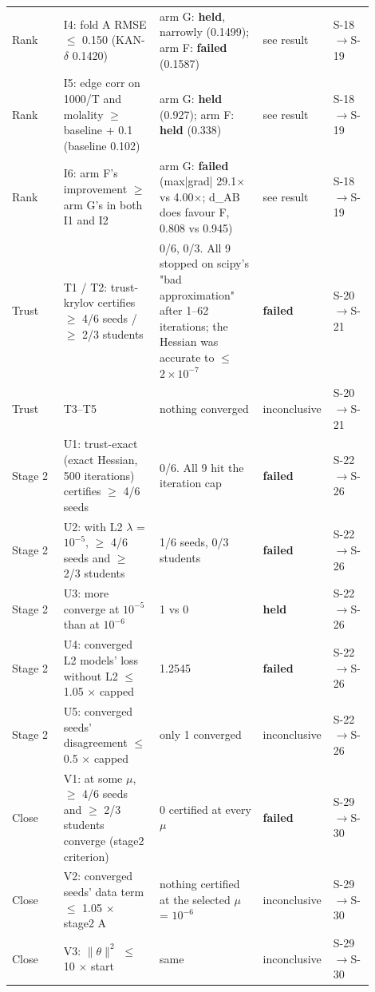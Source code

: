 {\begin{longtable}{R{0.14\linewidth} R{0.26\linewidth} R{0.29\linewidth} R{0.10\linewidth} R{0.11\linewidth}}
Rank & I4: fold A RMSE $\leq$ 0.150 (KAN-$\delta$ 0.1420) & arm G: \textbf{held}, narrowly (0.1499); arm F: \textbf{failed} (0.1587) & see result & S-18$\to$\allowbreak S-19 \\
Rank & I5: edge corr on 1000/T and molality $\geq$ baseline + 0.1 (baseline 0.102) & arm G: \textbf{held} (0.927); arm F: \textbf{held} (0.338) & see result & S-18$\to$\allowbreak S-19 \\
Rank & I6: arm F's improvement $\geq$ arm G's in both I1 and I2 & arm G: \textbf{failed} (max|grad| 29.1$\times$ vs 4.00$\times$; d\_AB does favour F, 0.808 vs 0.945) & see result & S-18$\to$\allowbreak S-19 \\
Trust & T1 / T2: trust-krylov certifies $\geq$ 4/6 seeds / $\geq$ 2/3 students & 0/6, 0/3. All 9 stopped on scipy's "bad approximation" after 1--62 iterations; the Hessian was accurate to $\leq$ $2\times10^{-7}$ & \textbf{failed} & S-20$\to$\allowbreak S-21 \\
Trust & T3--T5 & nothing converged & inconclusive & S-20$\to$\allowbreak S-21 \\
Stage 2 & U1: trust-exact (exact Hessian, 500 iterations) certifies $\geq$ 4/6 seeds & 0/6. All 9 hit the iteration cap & \textbf{failed} & S-22$\to$\allowbreak S-26 \\
Stage 2 & U2: with L2 $\lambda$ = $10^{-5}$, $\geq$ 4/6 seeds and $\geq$ 2/3 students & 1/6 seeds, 0/3 students & \textbf{failed} & S-22$\to$\allowbreak S-26 \\
Stage 2 & U3: more converge at $10^{-5}$ than at $10^{-6}$ & 1 vs 0 & \textbf{held} & S-22$\to$\allowbreak S-26 \\
Stage 2 & U4: converged L2 models' loss without L2 $\leq$ 1.05 $\times$ capped & 1.2545 & \textbf{failed} & S-22$\to$\allowbreak S-26 \\
Stage 2 & U5: converged seeds' disagreement $\leq$ 0.5 $\times$ capped & only 1 converged & inconclusive & S-22$\to$\allowbreak S-26 \\
Close & V1: at some $\mu$, $\geq$ 4/6 seeds and $\geq$ 2/3 students converge (stage2 criterion) & 0 certified at every $\mu$ & \textbf{failed} & S-29$\to$\allowbreak{}S-30 \\
Close & V2: converged seeds' data term $\leq$ 1.05 $\times$ stage2 A & nothing certified at the selected $\mu$ = $10^{-6}$ & inconclusive & S-29$\to$\allowbreak{}S-30 \\
Close & V3: $\|\theta\|^{2}$ $\leq$ 10 $\times$ start & same & inconclusive & S-29$\to$\allowbreak{}S-30 \\

\end{longtable}}
